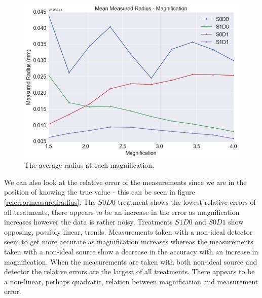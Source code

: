 \documentclass[
  twoside,
  11pt, a4paper,
  footinclude=true,
  headinclude=true,
  cleardoublepage=empty
]{scrbook}
\begin{document}
\begin{figure}[h!]
  \centering
    \includegraphics[width=\textwidth]{code/RadiusMeasurements/Plots_RadiusCentre_files/Plots_RadiusCentre_4_0.png}
    \caption{The average radius at each magnification.}
    \label{avgmeasuredradius}
\end{figure}

We can also look at the relative error of the measurements since we are in the position of knowing the true value - this can be seen in figure \ref{relerrormeasuredradius}. The $S0D0$ treatment shows the lowest relative errors of all treatments, there appears to be an increase in the error as magnification increases however the data is rather noisy. Treatments $S1D0$ and $S0D1$ show opposing, possibly linear, trends. Measurements taken with a non-ideal detector seem to get more accurate as magnification increases whereas the measurements taken with a non-ideal source show a decrease in the accuracy with an increase in magnification. When the measurements are taken with both non-ideal source and detector the relative errors are the largest of all treatments. There appears to be a non-linear, perhaps quadratic, relation between magnification and measurement error.
\end{document}

